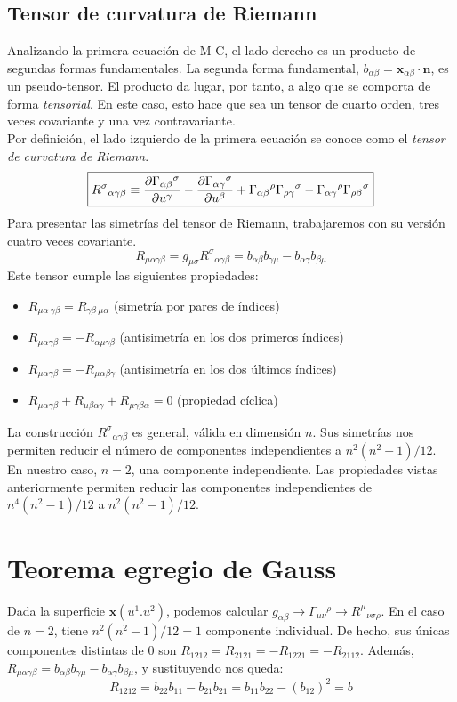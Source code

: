 \subsection{Tensor de curvatura de Riemann}
Analizando la primera ecuación de M-C, el lado derecho es un producto de segundas formas fundamentales. La segunda forma fundamental, $b_{\alpha \beta }=\mathbf{x}_{\alpha \beta }\cdot \mathbf{n}$, es un pseudo-tensor. El producto da lugar, por tanto, a algo que se comporta de forma \emph{tensorial}. En este caso, esto hace que sea un tensor de cuarto orden, tres veces covariante y una vez contravariante. \\

Por definición, el lado izquierdo de la primera ecuación se conoce como el \emph{tensor de curvatura de Riemann}.
$$
\boxed{R^\sigma {}_{\alpha \gamma \beta }\equiv \pdv{\Gamma_{\alpha \beta }{}^\sigma }{u^\gamma }-\pdv{\Gamma _{\alpha \gamma }{}^\sigma }{u^\beta }+\Gamma _{\alpha \beta} {}^\rho\Gamma _{\rho \gamma }{}^\sigma -\Gamma _{\alpha \gamma }{}^\rho \Gamma _{\rho \beta }{}^\sigma}
$$
Para presentar las simetrías del tensor de Riemann, trabajaremos con su versión cuatro veces covariante.
$$
R_{\mu \alpha \gamma \beta }=g_{\mu \sigma }R^\sigma {}_{\alpha \gamma \beta }=b_{\alpha \beta }b_{\gamma \mu} -b_{\alpha \gamma }b_{\beta \mu}
$$
Este tensor cumple las siguientes propiedades:
\begin{itemize}
    \item $R_{\mu \alpha \ \gamma \beta }= R_{ \gamma \beta \ \mu \alpha}$ (simetría por pares de índices)
    \item $R_{\mu \alpha  \gamma \beta }=-R_{\alpha  \mu  \gamma \beta }$ (antisimetría en los dos primeros índices)
    \item $R_{\mu \alpha  \gamma \beta }=-R_{\mu \alpha   \beta \gamma}$ (antisimetría en los dos últimos índices)
    \item $R_{\mu \alpha  \gamma \beta }+R_{\mu  \beta  \alpha  \gamma}+R_{\mu   \gamma \beta \alpha}=0$ (propiedad cíclica)
\end{itemize}

La construcción $R^\sigma {}_{\alpha \gamma \beta }$ es general, válida en dimensión $n$. Sus simetrías nos permiten reducir el número de componentes independientes a $n^2(n^2-1)/12$. En nuestro caso, $n=2$, una componente independiente. Las propiedades vistas anteriormente permiten reducir las componentes independientes de $n^4(n^2-1)/12$ a $n^2(n^2-1)/12$.
\section{Teorema egregio de Gauss}
Dada la superficie $\mathbf{x}(u^1.u^2)$, podemos calcular $g_{\alpha \beta }\rightarrow \Gamma_{\mu \nu }{}^\rho \rightarrow R^\mu {}_{\nu \sigma \rho}$. En el caso de $n=2$, tiene $n^2(n^2-1)/12=1$ componente individual. De hecho, sus únicas componentes distintas de 0 son $R_{1212}=R_{2121}=-R_{1221}=-R_{2112}$. Además, $R_{\mu \alpha \gamma \beta }=b_{\alpha \beta} b_{\gamma \mu}-b_{\alpha \gamma }b_{\beta \mu }$, y sustituyendo nos queda:
$$
R_{1212}=b_{22}b_{11}-b_{21}b_{21}=b_{11}b_{22}-(b_{12})^2=b
$$


